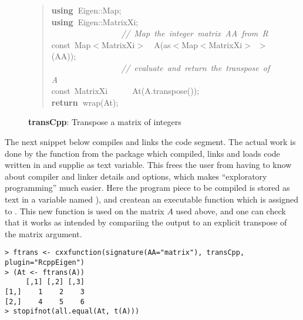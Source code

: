 \documentclass[shortnames,article]{jss}
\newcommand{\hlstd}[1]{\textcolor[rgb]{0,0,0}{#1}}
\newcommand{\hlslc}[1]{\textcolor[rgb]{0.67,0.13,0.13}{\it{#1}}}
\newcommand{\hlsym}[1]{\textcolor[rgb]{0,0,0}{#1}}
\newcommand{\hlkwa}[1]{\textcolor[rgb]{0.61,0.13,0.93}{\bf{#1}}}
\newcommand{\hlkwb}[1]{\textcolor[rgb]{0.13,0.54,0.13}{#1}}
\newcommand{\hlkwd}[1]{\textcolor[rgb]{0,0,0}{#1}}
\begin{document}
\begin{figure}[htb]
  \begin{quote}
    \noindent
    \ttfamily
    \hlstd{}\hlkwa{using\ }\hlstd{Eigen}\hlsym{::}\hlstd{Map}\hlsym{;}\hspace*{\fill}\\
    \hlstd{}\hlkwa{using\ }\hlstd{Eigen}\hlsym{::}\hlstd{MatrixXi}\hlsym{;}\hspace*{\fill}\\
    \hlstd{}\hlstd{\ \ \ \ \ \ \ \ \ \ \ \ \ \ \ \ \ }\hlstd{}\hlslc{//\ Map\ the\ integer\ matrix\ AA\ from\ R}\hspace*{\fill}\\
    \hlstd{}\hlkwb{const\ }\hlstd{Map}\hlsym{$<$}\hlstd{MatrixXi}\hlsym{$>$}\hlstd{\ \ }\hlsym{}\hlstd{}\hlkwd{A}\hlstd{}\hlsym{(}\hlstd{as}\hlsym{$<$}\hlstd{Map}\hlsym{$<$}\hlstd{MatrixXi}\hlsym{$>$\ $>$(}\hlstd{AA}\hlsym{));}\hspace*{\fill}\\
    \hlstd{}\hlstd{\ \ \ \ \ \ \ \ \ \ \ \ \ \ \ \ \ }\hlstd{}\hlslc{//\ evaluate\ and\ return\ the\ transpose\ of\ A}\hspace*{\fill}\\
    \hlstd{}\hlkwb{const\ }\hlstd{MatrixXi}\hlstd{\ \ \ \ \ \ }\hlstd{}\hlkwd{At}\hlstd{}\hlsym{(}\hlstd{A}\hlsym{.}\hlstd{}\hlkwd{transpose}\hlstd{}\hlsym{());}\hspace*{\fill}\\
    \hlstd{}\hlkwa{return\ }\hlstd{}\hlkwd{wrap}\hlstd{}\hlsym{(}\hlstd{At}\hlsym{);}\hlstd{}\hspace*{\fill}
    \normalfont
  \end{quote}
  \caption{\textbf{transCpp}: Transpose a matrix of integers}
  \label{trans}
\end{figure}

The next  snippet below compiles and links the  code
segment. The actual work is done by the function  from the 
package which compiled, links and loads code written in  and
supplie as text variable.  This frees the user from having to know about
compiler and linker details and options, which makes ``exploratory
programming'' much easier.  Here the program piece to be compiled is stored
as text in a variable named ), and  createan
an executable function which is assigned to .  This new function
is used on the matrix $A$ used above, and one can check that it works as intended
by compariing the output to an explicit transpose of the matrix argument.
\begin{verbatim}
> ftrans <- cxxfunction(signature(AA="matrix"), transCpp, plugin="RcppEigen")
> (At <- ftrans(A))
     [,1] [,2] [,3]
[1,]    1    2    3
[2,]    4    5    6
> stopifnot(all.equal(At, t(A)))
\end{verbatim}
\end{document}

